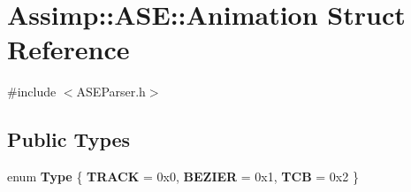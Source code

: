\hypertarget{struct_assimp_1_1_a_s_e_1_1_animation}{\section{Assimp\+:\+:A\+S\+E\+:\+:Animation Struct Reference}
\label{struct_assimp_1_1_a_s_e_1_1_animation}
}


{\ttfamily \#include $<$A\+S\+E\+Parser.\+h$>$}

\subsection*{Public Types}
\begin{DoxyCompactItemize}
\item 
\hypertarget{struct_assimp_1_1_a_s_e_1_1_animation_a9a786a27fe9dce950c8fd99ba31ade3f}{enum {\bfseries Type} \{ {\bfseries T\+R\+A\+C\+K} = 0x0, 
{\bfseries B\+E\+Z\+I\+E\+R} = 0x1, 
{\bfseries T\+C\+B} = 0x2
 \}}\label{struct_assimp_1_1_a_s_e_1_1_animation_a9a786a27fe9dce950c8fd99ba31ade3f}

\end{DoxyCompactItemize}
